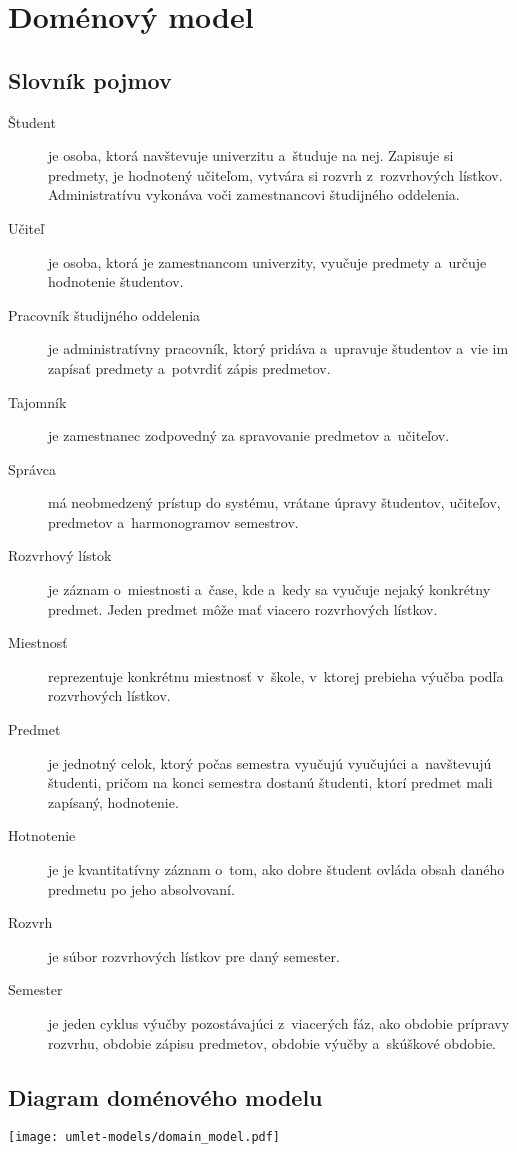 \section{Doménový model}

\subsection{Slovník pojmov}

\begin{description}
    \item[Študent] je osoba, ktorá navštevuje univerzitu a~študuje na nej.
    Zapisuje si predmety, je hodnotený učiteľom, vytvára si rozvrh
    z~rozvrhových lístkov. Administratívu vykonáva voči zamestnancovi
    študijného oddelenia.

    \item[Učiteľ] je osoba, ktorá je zamestnancom univerzity, vyučuje
    predmety a~určuje hodnotenie študentov.

    \item[Pracovník študijného oddelenia] je administratívny pracovník,
    ktorý pridáva a~upravuje študentov a~vie im zapísať predmety
    a~potvrdiť zápis predmetov.

    \item[Tajomník] je zamestnanec zodpovedný za spravovanie predmetov
    a~učiteľov.

    \item[Správca] má neobmedzený prístup do systému, vrátane úpravy
    študentov, učiteľov, predmetov a~harmonogramov semestrov.

    \item[Rozvrhový lístok] je záznam o~miestnosti a~čase, kde a~kedy sa
    vyučuje nejaký konkrétny predmet. Jeden predmet môže mať viacero
    rozvrhových lístkov.

    \item[Miestnosť] reprezentuje konkrétnu miestnosť v~škole, v~ktorej
    prebieha výučba podľa rozvrhových lístkov.

    \item[Predmet] je jednotný celok, ktorý počas semestra vyučujú
    vyučujúci a~navštevujú študenti, pričom na konci semestra dostanú
    študenti, ktorí predmet mali zapísaný, hodnotenie.

    \item[Hotnotenie] je je kvantitatívny záznam o~tom, ako dobre študent
    ovláda obsah daného predmetu po jeho absolvovaní.

    \item[Rozvrh] je súbor rozvrhových lístkov pre daný semester.

    \item[Semester] je jeden cyklus výučby pozostávajúci z~viacerých fáz,
    ako obdobie prípravy rozvrhu, obdobie zápisu predmetov, obdobie výučby
    a~skúškové obdobie.
\end{description}

\subsection{Diagram doménového modelu}

\texttt{[image: umlet-models/domain\_model.pdf]}
